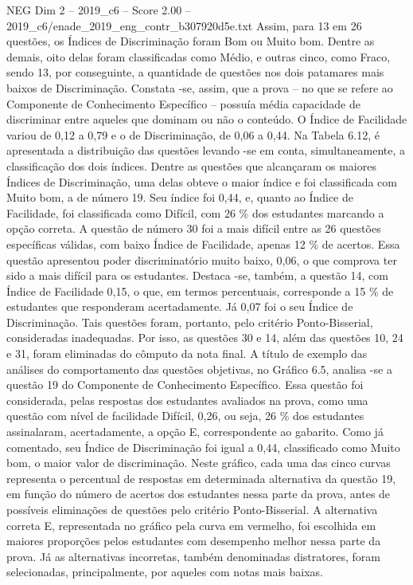 \begin{textsample}{NEG Dim 2 – 2019\_c6 – Score 2.00 – 2019\_c6/enade\_2019\_eng\_contr\_b307920d5e.txt}
Assim, para 13 em 26 questões, os Índices de Discriminação foram Bom ou Muito bom.
Dentre as demais, oito delas foram classificadas como Médio, e outras cinco, como Fraco, sendo 13, por conseguinte, a quantidade de questões nos dois patamares mais baixos de Discriminação.
Constata -se, assim, que a prova – no que se refere ao Componente de Conhecimento Específico – possuía média capacidade de discriminar entre aqueles que dominam ou não o conteúdo.
O Índice de Facilidade variou de 0,12 a 0,79 e o de Discriminação, de 0,06 a 0,44.
Na Tabela 6.12, é apresentada a distribuição das questões levando -se em conta, simultaneamente, a classificação dos dois índices.
Dentre as questões que alcançaram os maiores Índices de Discriminação, uma delas obteve o maior índice e foi classificada com Muito bom, a de número 19.
Seu índice foi 0,44, e, quanto ao Índice de Facilidade, foi classificada como Difícil, com 26 \% dos estudantes marcando a opção correta.
A questão de número 30 foi a mais difícil entre as 26 questões específicas válidas, com baixo Índice de Facilidade, apenas 12 \% de acertos.
Essa questão apresentou poder discriminatório muito baixo, 0,06, o que comprova ter sido a mais difícil para os estudantes.
Destaca -se, também, a questão 14, com Índice de Facilidade 0,15, o que, em termos percentuais, corresponde a 15 \% de estudantes que responderam acertadamente.
Já 0,07 foi o seu Índice de Discriminação.
Tais questões foram, portanto, pelo critério Ponto-Bisserial, consideradas inadequadas.
Por isso, as questões 30 e 14, além das questões 10, 24 e 31, foram eliminadas do cômputo da nota final.
A título de exemplo das análises do comportamento das questões objetivas, no Gráfico 6.5, analisa -se a questão 19 do Componente de Conhecimento Específico.
Essa questão foi considerada, pelas respostas dos estudantes avaliados na prova, como uma questão com nível de facilidade Difícil, 0,26, ou seja, 26 \% dos estudantes assinalaram, acertadamente, a opção E, correspondente ao gabarito.
Como já comentado, seu Índice de Discriminação foi igual a 0,44, classificado como Muito bom, o maior valor de discriminação.
Neste gráfico, cada uma das cinco curvas representa o percentual de respostas em determinada alternativa da questão 19, em função do número de acertos dos estudantes nessa parte da prova, antes de possíveis eliminações de questões pelo critério Ponto-Bisserial.
A alternativa correta E, representada no gráfico pela curva em vermelho, foi escolhida em maiores proporções pelos estudantes com desempenho melhor nessa parte da prova.
Já as alternativas incorretas, também denominadas distratores, foram selecionadas, principalmente, por aqueles com notas mais baixas.

\end{textsample}
